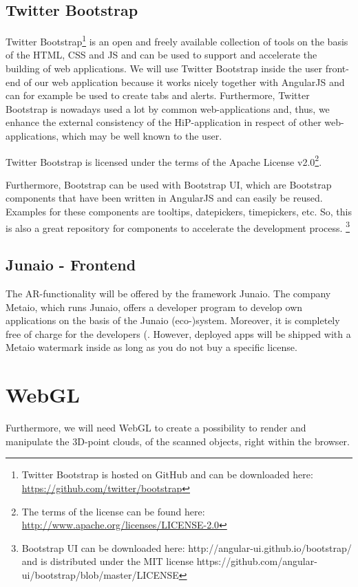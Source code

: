 \subsection{Twitter Bootstrap}
Twitter Bootstrap\footnote{Twitter Bootstrap is hosted on GitHub and can be downloaded here: \url{https://github.com/twitter/bootstrap}} is an open and freely available collection of tools on the basis of the \ac{HTML}, \ac{CSS} and \ac{JS} and can be used to support and accelerate the building of web applications. We will use Twitter Bootstrap inside the user front-end of our web application because it works nicely together with AngularJS and can for example be used to create tabs and alerts. Furthermore, Twitter Bootstrap is nowadays used a lot by common web-applications and, thus, we enhance the external consistency  of the \ac{HiP}-application in respect of other web-applications, which may be well known to the user. 

Twitter Bootstrap is licensed under the terms of the Apache License v2.0\footnote{The terms of the license can be found here: \url{http://www.apache.org/licenses/LICENSE-2.0}}.

Furthermore, Bootstrap can be used with Bootstrap UI, which are Bootstrap components that have been written in AngularJS and can easily be reused. Examples for these components are tooltips, datepickers, timepickers, etc. So, this is also a great repository for components to accelerate the development process. \footnote{Bootstrap UI can be downloaded here: http://angular-ui.github.io/bootstrap/ and is distributed under the MIT license https://github.com/angular-ui/bootstrap/blob/master/LICENSE}

\subsection{Junaio - Frontend}
The \ac{AR}-functionality will be offered by the framework Junaio. The company Metaio, which runs Junaio, offers a developer program to develop own applications on the basis of the Junaio (eco-)system. Moreover, it is completely free of charge for the developers (\cite{junaio1}. However, deployed apps will be shipped with a Metaio watermark inside as long as you do not buy a specific license. 

\section{WebGL}
Furthermore, we will need \ac{WebGL} to create a possibility to render and manipulate the 3D-point clouds, of the scanned objects, right within the browser.


